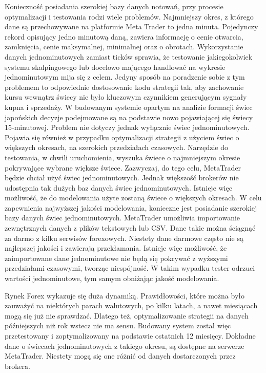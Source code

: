 \documentclass[pdflatex,11pt]{aghdpl}
\begin{document}
Konieczność posiadania szerokiej bazy danych notowań, przy procesie optymalizacji i testowania rodzi wiele problemów. Najmniejszy okres, z którego dane są przechowywane na platformie Meta Trader to jedna minuta. Pojedynczy rekord opisujący jedno minutową daną, zawiera informację o cenie otwarcia, zamknięcia, cenie maksymalnej, minimalnej oraz o obrotach. Wykorzystanie danych jednominutowych zamiast ticków sprawia, że testowanie jakiegokolwiek systemu skalpingowego lub docelowo mającego handlować na wykresie jednominutowym mija się z celem. Jedyny sposób na poradzenie sobie z tym problemem to odpowiednie dostosowanie kodu strategii tak, aby zachowanie kursu wewnątrz świecy nie było kluczowym czynnikiem generującym sygnały kupna i sprzedaży. W budowanym systemie opartym na analizie formacji świec japońskich decyzje podejmowane są na podstawie nowo pojawiającej się świecy 15-minutowej. Problem nie dotyczy jednak wyłącznie świec jednominutowych. Pojawia się również w przypadku optymalizacji strategii z użyciem świec o większych okresach, na szerokich przedziałach czasowych. Narzędzie do testowania, w chwili uruchomienia, wyszuka świece o najmniejszym okresie pokrywające wybrane większe świece. Zazwyczaj, do tego celu, MetaTrader będzie chciał użyć świec jednominutowych. Jednak większość brokerów nie udostępnia tak dużych baz danych świec jednominutowych. Istnieje więc możliwość, że do modelowania użyte zostaną świece o większych okresach. W celu zapewnienia najwyższej jakości modelowania, konieczne jest posiadanie szerokiej bazy danych świec jednominutowych.
MetaTrader umożliwia importowanie zewnętrznych danych z plików tekstowych lub CSV. Dane takie można ściągnąć za darmo z kilku serwisów forexowych. Niestety dane darmowe często nie są najlepszej jakości i zawierają przekłamania. Istnieje więc możliwość, że zaimportowane dane jednominutowe nie będą się pokrywać z wyższymi przedziałami czasowymi, tworząc niespójność. W takim wypadku tester odrzuci wartości jednominutowe, tym samym obniżając jakość modelowania.
 
Rynek Forex wykazuje się duża dynamiką. Prawidłowości, które można było zauważyć na niektórych parach walutowych, po kilku latach, a nawet miesiącach mogą się już nie sprawdzać. Dlatego też, optymalizowanie strategii na danych późniejszych niż rok wstecz nie ma sensu. Budowany system został więc przetestowany i zoptymalizowany na podstawie ostatnich 12 miesięcy. Dokładne dane o świecach jednominutowych z takiego okresu, są dostępne na serwerze MetaTrader. Niestety mogą się one różnić od danych dostarczonych przez brokera.
\end{document}
